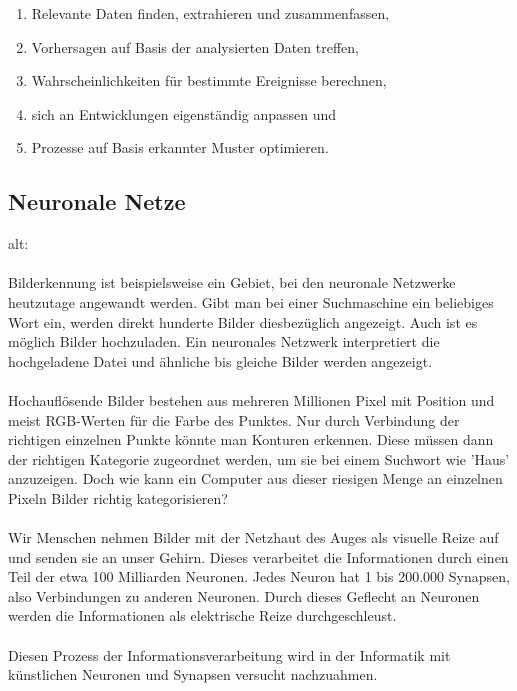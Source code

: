 \documentclass[12pt,oneside,a4paper,parskip]{scrbook}
\begin{document}
\begin{enumerate}
	\item Relevante Daten finden, extrahieren und zusammenfassen,
	\item Vorhersagen auf Basis der analysierten Daten treffen,
	\item Wahrscheinlichkeiten für bestimmte Ereignisse berechnen,
	\item sich an Entwicklungen eigenständig anpassen und
	\item Prozesse auf Basis erkannter Muster optimieren.
\end{enumerate}
\subsection{Neuronale Netze}
alt:
\\\\
Bilderkennung ist beispielsweise ein Gebiet, bei den neuronale Netzwerke heutzutage angewandt werden. Gibt man bei einer Suchmaschine ein beliebiges Wort ein, werden direkt hunderte Bilder diesbezüglich angezeigt. Auch ist es möglich Bilder hochzuladen. Ein neuronales Netzwerk interpretiert die hochgeladene Datei und ähnliche bis gleiche Bilder werden angezeigt. 
\\\\
Hochauflösende Bilder bestehen aus mehreren Millionen Pixel mit Position und meist RGB-Werten für die Farbe des Punktes. 
Nur durch Verbindung der richtigen einzelnen Punkte könnte man Konturen erkennen. 
%
Diese müssen dann der richtigen Kategorie zugeordnet werden, um sie bei einem Suchwort wie 'Haus' anzuzeigen. Doch wie kann ein Computer aus dieser riesigen Menge an einzelnen Pixeln Bilder richtig kategorisieren?
\\\\
Wir Menschen nehmen Bilder mit der Netzhaut des Auges als visuelle Reize auf und senden sie an unser Gehirn. Dieses verarbeitet die Informationen durch einen Teil der etwa 100 Milliarden Neuronen. Jedes Neuron hat 1 bis 200.000 Synapsen, also Verbindungen zu anderen Neuronen. Durch dieses Geflecht an Neuronen werden die Informationen als elektrische Reize durchgeschleust. %
\\\\
Diesen Prozess der Informationsverarbeitung wird in der Informatik mit künstlichen Neuronen und Synapsen versucht nachzuahmen. 
\end{document}
